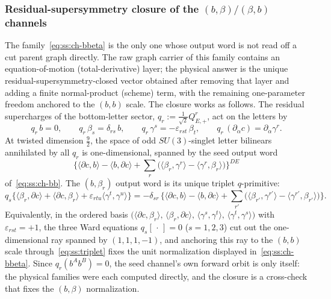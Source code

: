 \subsubsection*{Residual-supersymmetry closure of the $(b,\beta)/(\beta,b)$
channels}

The family~\eqref{eq:ss:ch-bbeta} is the only one whose output word is not
read off a cut parent graph directly. The raw graph carrier of this family
contains an equation-of-motion (total-derivative) layer; the physical answer
is the unique residual-supersymmetry-closed vector obtained after removing
that layer and adding a finite normal-product (scheme) term, with the
remaining one-parameter freedom anchored to the $(b,b)$ scale. The closure
works as follows. The residual supercharges of the bottom-letter sector,
$q_r:=\tfrac{1}{\sqrt2}Q^{r}_{E,+}$, act on the letters by
\begin{equation}\label{eq:ss:qaction}
q_r\,b=0,
\qquad
q_r\,\beta_s=\delta_{rs}\,b,
\qquad
q_r\,\gamma^{s}=-\varepsilon_{rst}\,\beta_t,
\qquad
q_r\,(\partial_{\dot\alpha}c)=\partial_{\dot\alpha}\gamma^{r} .
\end{equation}
At twisted dimension $\tfrac92$, the space of odd $SU(3)$-singlet letter
bilinears annihilated by all $q_r$ is one-dimensional, spanned by the seed
output word
\begin{equation}\label{eq:ss:singlet}
\big\{\langle\partial c,b\rangle-\langle b,\partial c\rangle
+\textstyle\sum_r\big(\langle\beta_r,\gamma^r\rangle
-\langle\gamma^r,\beta_r\rangle\big)\big\}^{DE}
\end{equation}
of~\eqref{eq:ss:ch-bb}. The $(b,\beta_r)$ output word is its unique triplet
$q$-primitive:
\begin{equation}\label{eq:ss:triplet}
q_s\big\{\langle\beta_r,\partial c\rangle+\langle\partial c,\beta_r\rangle
+\varepsilon_{rtu}\langle\gamma^{t},\gamma^{u}\rangle\big\}
=-\delta_{sr}\,
\Big\{\langle\partial c,b\rangle-\langle b,\partial c\rangle
+\textstyle\sum_{r'}\big(\langle\beta_{r'},\gamma^{r'}\rangle
-\langle\gamma^{r'},\beta_{r'}\rangle\big)\Big\} .
\end{equation}
Equivalently, in the ordered basis
$\big(\langle\partial c,\beta_r\rangle,\,\langle\beta_r,\partial c\rangle,\,
\langle\gamma^{s},\gamma^{t}\rangle,\,\langle\gamma^{t},\gamma^{s}\rangle\big)$
with $\varepsilon_{rst}=+1$, the three Ward equations $q_s[\,\cdot\,]=0$
($s=1,2,3$) cut out the one-dimensional ray spanned by $(1,1,1,-1)$, and
anchoring this ray to the $(b,b)$ scale through~\eqref{eq:ss:triplet} fixes
the unit normalization displayed in~\eqref{eq:ss:ch-bbeta}. Since
$q_r(b^Ab^B)=0$, the seed channel's own forward orbit is only itself: the
physical families were each computed directly, and the closure is a
cross-check that fixes the $(b,\beta)$ normalization.

